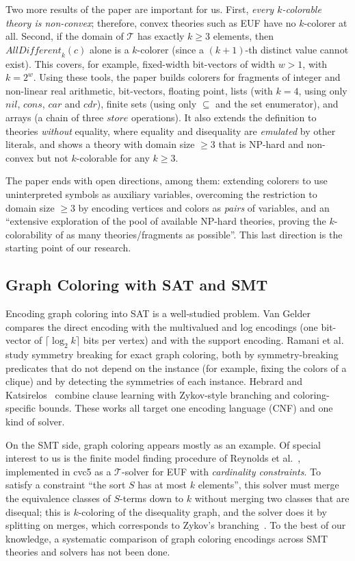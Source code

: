 \documentclass[12pt,a4paper]{article}
\newcommand{\T}{\mathcal{T}}
\newcommand{\AllDiff}{\mathit{AllDifferent}}
\theoremstyle{definition}
\begin{document}
Two more results of the paper are important for us. First, \emph{every
$k$-colorable theory is non-convex}; therefore, convex theories such as EUF have
no $k$-colorer at all. Second, if the domain of $\T$ has exactly $k \geq 3$
elements, then $\AllDiff_k(c)$ alone is a $k$-colorer (since a $(k+1)$-th distinct
value cannot exist). This covers, for example, fixed-width bit-vectors of width
$w > 1$, with $k = 2^w$. Using these tools, the paper builds colorers for
fragments of integer and non-linear real arithmetic, bit-vectors, floating point,
lists (with $k = 4$, using only $\mathit{nil}$, $\mathit{cons}$, $\mathit{car}$ and
$\mathit{cdr}$), finite sets (using only $\subseteq$ and the set enumerator), and
arrays (a chain of three $\mathit{store}$ operations). It also extends the
definition to theories \emph{without} equality, where equality and disequality are
\emph{emulated} by other literals, and shows a theory with domain size $\geq 3$
that is NP-hard and non-convex but not $k$-colorable for any $k \geq 3$.

The paper ends with open directions, among them: extending colorers to use
uninterpreted symbols as auxiliary variables, overcoming the restriction to domain
size $\geq 3$ by encoding vertices and colors as \emph{pairs} of variables, and an
``extensive exploration of the pool of available NP-hard theories, proving the
$k$-colorability of as many theories/fragments as possible''. This last direction
is the starting point of our research.

\subsection{Graph Coloring with SAT and SMT}

Encoding graph coloring into SAT is a well-studied problem. Van
Gelder~\cite{VanGelder08} compares the direct encoding with the multivalued and
log encodings (one bit-vector of $\lceil \log_2 k \rceil$ bits per vertex) and with
the support encoding. Ramani et al.~\cite{RamaniAMS06} study symmetry breaking for
exact graph coloring, both by symmetry-breaking predicates that do not depend on the
instance (for example, fixing the colors of a clique) and by detecting the
symmetries of each instance. Hebrard and Katsirelos~\cite{HebrardK18} combine
clause learning with Zykov-style branching and coloring-specific bounds. These works
all target one encoding language (CNF) and one kind of solver.

On the SMT side, graph coloring appears mostly as an example. Of special interest
to us is the finite model finding procedure of Reynolds et al.~\cite{ReynoldsTGK13},
implemented in cvc5 as a $\T$-solver for EUF with \emph{cardinality constraints}.
To satisfy a constraint ``the sort $S$ has at most $k$ elements'', this solver must
merge the equivalence classes of $S$-terms down to $k$ without merging two classes
that are disequal; this is $k$-coloring of the disequality graph, and the solver
does it by splitting on merges, which corresponds to Zykov's
branching~\cite{Zykov49}. To the best of our knowledge, a systematic comparison of
graph coloring encodings across SMT theories and solvers has not been done.
\end{document}
